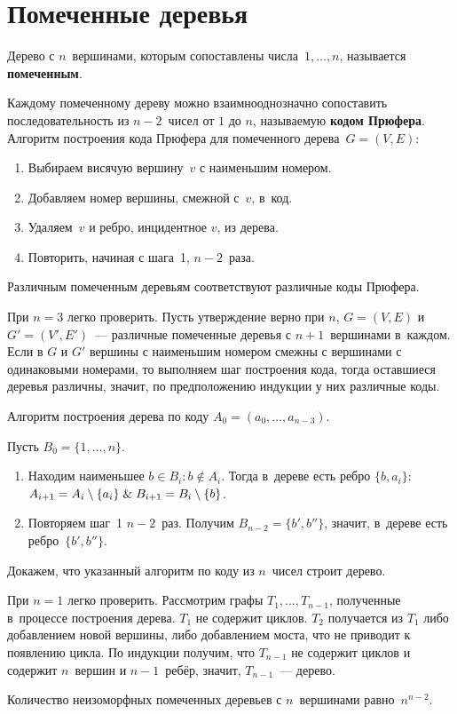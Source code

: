 \section{Помеченные деревья}
 Дерево с $n$~вершинами, которым сопоставлены числа~$1, \ldots, n$, называется \textbf{помеченным}.

 Каждому помеченному дереву можно взаимнооднозначно сопоставить последовательность из $n - 2$~чисел от $1$ до $n$, называемую \textbf{кодом Прюфера}.
Алгоритм построения кода Прюфера для помеченного дерева~$G = (V, E)$:
\begin{enumerate}
	\item Выбираем висячую вершину~$v$ с наименьшим номером.
	\item Добавляем номер вершины, смежной с~$v$, в~код.
	\item Удаляем~$v$ и ребро, инцидентное $v$, из дерева.
	\item Повторить, начиная с шага~1, $n - 2$~раза.
\end{enumerate}

\begin{statement}
Различным помеченным деревьям соответствуют различные коды Прюфера.
\end{statement}
\begin{proofmathind}
	\indbase При $n = 3$ легко проверить.
	\indstep Пусть утверждение верно при $n$, $G = (V, E)$ и $G' = (V', E')$~--- различные помеченные деревья с $n + 1$~вершинами в~каждом.
	Если в $G$ и $G'$ вершины с наименьшим номером смежны с вершинами с одинаковыми номерами, то выполняем шаг построения кода, тогда оставшиеся деревья различны, значит, по предположению индукции у них различные коды. \indend
\end{proofmathind}

Алгоритм построения дерева по коду $A_0 = (a_0, \ldots, a_{n-3})$.

Пусть $B_0 = \{ 1, \ldots, n \}$.
\begin{enumerate}
	\item Находим наименьшее $b \in B_i \colon b \notin A_i$.
	Тогда в~дереве есть ребро $\{ b, a_i \}$: $A_{i+1} = A_i \setminus \{ a_i \} \mathrel{\&} B_{i+1} = B_i \setminus \{ b \}$.
	\item Повторяем шаг~1 $n - 2$~раз.
	Получим $B_{n-2} = \{ b', b'' \}$, значит, в~дереве есть ребро~$\{ b', b'' \}$.
\end{enumerate}

Докажем, что указанный алгоритм по коду из $n$~чисел строит дерево.
\begin{proofmathind}
	\indbase При $n = 1$ легко проверить.
	\indstep Рассмотрим графы $T_1, \ldots, T_{n-1}$, полученные в~процессе построения дерева.
	$T_1$ не содержит циклов.
	$T_2$ получается из $T_1$ либо добавлением новой вершины, либо добавлением моста, что не приводит к появлению цикла.	
	По индукции получим, что $T_{n-1}$ не содержит циклов и содержит $n$~вершин и $n - 1$~ребёр, значит, $T_{n-1}$~--- дерево.
	\indend
\end{proofmathind}

\begin{theorem}[Кэли]
Количество неизоморфных помеченных деревьев с $n$~вершинами равно~$n^{n-2}$.
\end{theorem}